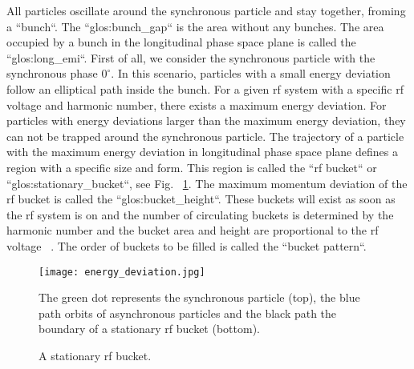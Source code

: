 All particles oscillate around the synchronous particle and stay together, froming a ``bunch``. The ``\gls{glos:bunch_gap}`` is the area without any bunches. The area occupied by a bunch in the longitudinal phase space plane is called the ``\gls{glos:long_emi}``. First of all, we consider the synchronous particle with the synchronous phase $0^\circ$. In this scenario, particles with a small energy deviation follow an elliptical path inside the bunch. For a given rf system with a specific rf voltage and harmonic number, there exists a maximum energy deviation. For particles with energy deviations larger than the maximum energy deviation, they can not be trapped around the synchronous particle. The trajectory of a particle with the maximum energy deviation in longitudinal phase space plane defines a region with a specific size and form. This region is called the ``rf bucket`` or ``\gls{glos:stationary_bucket}``, see Fig. ~\ref{energy_deviation}. The maximum momentum deviation of the rf bucket is called the ``\gls{glos:bucket_height}``. These buckets will exist as soon as the rf system is on and the number of circulating buckets is determined by the harmonic number and the bucket area and height are proportional to the rf voltage ~\cite{lee_accelerator_2011}. The order of buckets to be filled is called the ``bucket pattern``.
\begin{figure}[!htb]
   \centering   
   \texttt{[image: energy\_deviation.jpg]}
   \caption{A stationary rf bucket.}{The green dot represents the synchronous particle (top), the blue path orbits of asynchronous particles and the black path the boundary of a stationary rf bucket (bottom).}
   \label{energy_deviation}
\end{figure} 

